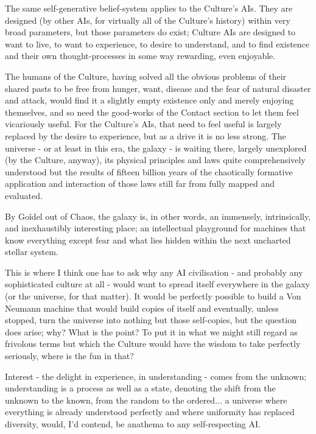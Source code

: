 The same self-generative belief-system applies to the Culture's AIs. They are designed (by other AIs, for virtually all of the Culture's history) within very broad parameters, but those parameters do exist; Culture AIs are designed to want to live, to want to experience, to desire to understand, and to find existence and their own thought-processes in some way rewarding, even enjoyable.

The humans of the Culture, having solved all the obvious problems of their shared pasts to be free from hunger, want, disease and the fear of natural disaster and attack, would find it a slightly empty existence only and merely enjoying themselves, and so need the good-works of the Contact section to let them feel vicariously useful. For the Culture's AIs, that need to feel useful is largely replaced by the desire to experience, but as a drive it is no less strong. The universe - or at least in this era, the galaxy - is waiting there, largely unexplored (by the Culture, anyway), its physical principles and laws quite comprehensively understood but the results of fifteen billion years of the chaotically formative application and interaction of those laws still far from fully mapped and evaluated.

By Goîdel out of Chaos, the galaxy is, in other words, an immensely, intrinsically, and inexhaustibly interesting place; an intellectual playground for machines that know everything except fear and what lies hidden within the next uncharted stellar system.

This is where I think one has to ask why any AI civilisation - and probably any sophisticated culture at all - would want to spread itself everywhere in the galaxy (or the universe, for that matter). It would be perfectly possible to build a Von Neumann machine that would build copies of itself and eventually, unless stopped, turn the universe into nothing but those self-copies, but the question does arise; why? What is the point? To put it in what we might still regard as frivolous terms but which the Culture would have the wisdom to take perfectly seriously, where is the fun in that?

Interest - the delight in experience, in understanding - comes from the unknown; understanding is a process as well as a state, denoting the shift from the unknown to the known, from the random to the ordered... a universe where everything is already understood perfectly and where uniformity has replaced diversity, would, I'd contend, be anathema to any self-respecting AI.

